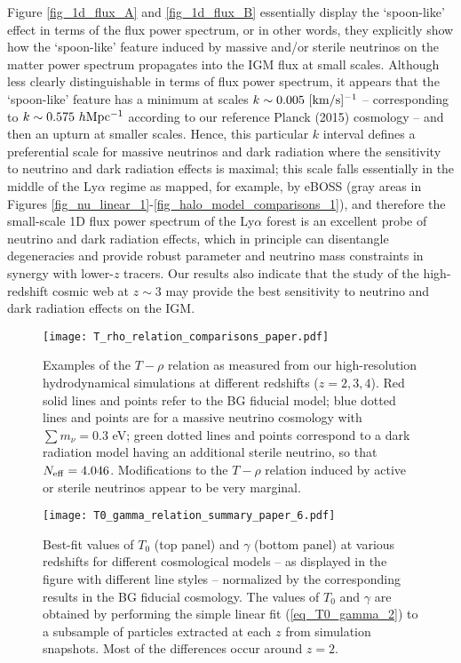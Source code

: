 \documentclass{emulateapj}
\begin{document}
Figure \ref{fig_1d_flux_A} and \ref{fig_1d_flux_B}  essentially display the `spoon-like' effect in terms of the flux power spectrum, or
in other words, they explicitly show how the `spoon-like' feature induced by massive and/or sterile neutrinos on the matter power spectrum propagates 
into the IGM flux at small scales.  Although less clearly distinguishable in terms of flux power spectrum, it appears
that the `spoon-like'  feature has a minimum
at scales $k \sim 0.005~{\rm [km/s]^{-1}}$ -- corresponding to  $k \sim 0.575~h{\rm Mpc^{-1}}$  according to
our reference Planck (2015) cosmology -- and then  an upturn
at smaller scales. Hence,  this particular $k$ interval defines a preferential scale for massive neutrinos and dark radiation 
where the sensitivity to neutrino and dark radiation effects is maximal; 
this scale falls essentially in the middle of the Ly$\alpha$ regime as mapped, for example, by eBOSS (gray areas in Figures \ref{fig_nu_linear_1}-\ref{fig_halo_model_comparisons_1}), and therefore
the small-scale 1D flux power spectrum of the Ly$\alpha$ forest is an excellent probe 
of neutrino and dark radiation effects, which in principle can 
disentangle degeneracies and provide robust parameter and neutrino mass  constraints in synergy with lower-$z$ tracers.  
Our results also indicate that the study of the high-redshift cosmic web at $z \sim 3$ may provide the best sensitivity to neutrino and dark radiation effects 
on the IGM. 

\begin{figure*}
\centering
\texttt{[image: T\_rho\_relation\_comparisons\_paper.pdf]}
\caption{Examples of the $T-\rho$ relation as measured from our high-resolution hydrodynamical simulations
at different redshifts ($z=2,3,4$). Red solid lines and points refer to the BG fiducial model; blue dotted lines and points
are for a massive neutrino cosmology with $\sum m_{\nu}=0.3$ eV; green dotted lines and points correspond to 
  a dark radiation model having an additional sterile neutrino, so that $N_{\rm eff} =4.046$. Modifications to the
 $T-\rho$ relation induced by active or sterile neutrinos appear to be very marginal.}
\label{fig_T0_gamma_1}
\end{figure*}

\begin{figure}
\centering
\texttt{[image: T0\_gamma\_relation\_summary\_paper\_6.pdf]}
\caption{Best-fit values of $T_0$ (top panel) and $\gamma$ (bottom panel) at various redshifts for different cosmological models  -- as displayed in the figure with different line styles --
normalized by the corresponding results in the BG fiducial cosmology. The values of $T_0$ and $\gamma$ are obtained by performing the simple 
linear fit (\ref{eq_T0_gamma_2})  to a subsample of particles extracted  at each $z$ from 
simulation snapshots. Most of the differences occur around $z=2$.}
\label{fig_T0_gamma_2}
\end{figure}
\end{document}
